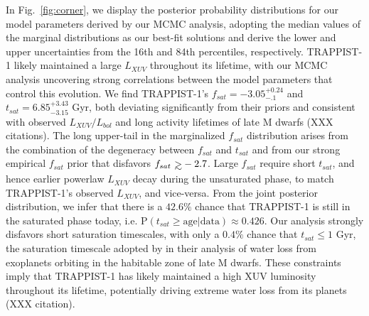 \documentclass[twocolumn]{aastex62}
\def\gsim{~\rlap{$>$}{\lower 1.0ex\hbox{$\sim$}}}
\begin{document}
In Fig.~\ref{fig:corner}, we display the posterior probability distributions for our model parameters derived by our MCMC analysis, adopting the median values of the marginal distributions as our best-fit solutions and derive the lower and upper uncertainties from the 16th and 84th percentiles, respectively. TRAPPIST-1 likely maintained a large $L_{XUV}$ throughout its lifetime, with our MCMC analysis uncovering strong correlations between the model parameters that control this evolution. We find TRAPPIST-1's $f_{sat} = -3.05^{+0.24}_{-.1}$ and $t_{sat} = 6.85^{+3.43}_{-3.15}$ Gyr, both deviating significantly from their priors and consistent with observed $L_{XUV}/L_{bol}$ and long activity lifetimes of late M dwarfs (XXX citations). The long upper-tail in the marginalized $f_{sat}$ distribution arises from the combination of the degeneracy between $f_{sat}$ and $t_{sat}$ and from our strong empirical $f_{sat}$ prior that disfavors $f_{sat} \gsim -2.7$. Large $f_{sat}$ require short $t_{sat}$, and hence earlier powerlaw $L_{XUV}$ decay during the unsaturated phase, to match TRAPPIST-1's observed $L_{XUV}$, and vice-versa. From the joint posterior distribution, we infer that there is a $42.6\%$ chance that TRAPPIST-1 is still in the saturated phase today, i.e. P$(t_{sat} \geq \mathrm{ age } | \mathrm{data}) \approx 0.426$. Our analysis strongly disfavors short saturation timescales, with only a $0.4\%$ chance that $t_{sat} \leq 1$ Gyr, the saturation timescale adopted by \citet{Luger2015} in their analysis of water loss from exoplanets orbiting in the habitable zone of late M dwarfs. These constraints imply that TRAPPIST-1 has likely maintained a high XUV luminosity throughout its lifetime, potentially driving extreme water loss from its planets (XXX citation).
\end{document}
